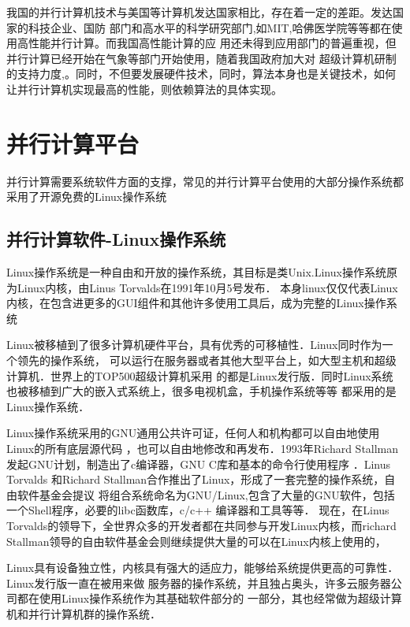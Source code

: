 我国的并行计算机技术与美国等计算机发达国家相比，存在着一定的差距。发达国家的科技企业、国防
部门和高水平的科学研究部门,如MIT,哈佛医学院等等都在使用高性能并行计算。而我国高性能计算的应
用还未得到应用部门的普遍重视，但并行计算已经开始在气象等部门开始使用，随着我国政府加大对
超级计算机研制的支持力度,。同时，不但要发展硬件技术，同时，算法本身也是关键技术，如何让并行计算机实现最高的性能，则依赖算法的具体实现。

    

\section{并行计算平台}
    并行计算需要系统软件方面的支撑，常见的并行计算平台使用的大部分操作系统都采用了开源免费的Linux操作系统

\subsection{并行计算软件-Linux操作系统}
    Linux操作系统是一种自由和开放的操作系统，其目标是类Unix.Linux操作系统原为Linux内核，由Linus Torvalds在1991年10月5号发布．
本身linux仅仅代表Linux内核，在包含进更多的GUI组件和其他许多使用工具后，成为完整的Linux操作系统

    Linux被移植到了很多计算机硬件平台，具有优秀的可移植性．Linux同时作为一个领先的操作系统，
可以运行在服务器或者其他大型平台上，如大型主机和超级计算机．世界上的TOP500超级计算机采用
的都是Linux发行版．同时Linux系统也被移植到广大的嵌入式系统上，很多电视机盒，手机操作系统等等
都采用的是Linux操作系统．

    Linux操作系统采用的GNU通用公共许可证，任何人和机构都可以自由地使用Linux的所有底层源代码
，也可以自由地修改和再发布．1993年Richard Stallman发起GNU计划，制造出了c编译器，GNU C库和基本的命令行使用程序
．Linus Torvalds 和Richard Stallman合作推出了Linux，形成了一套完整的操作系统，自由软件基金会提议
将组合系统命名为GNU/Linux,包含了大量的GNU软件，包括一个Shell程序，必要的libc函数库，c/c++
编译器和工具等等． 现在，在Linus Torvalds的领导下，全世界众多的开发者都在共同参与开发Linux内核，而richard 
Stallman领导的自由软件基金会则继续提供大量的可以在Linux内核上使用的，

    Linux具有设备独立性，内核具有强大的适应力，能够给系统提供更高的可靠性．Linux发行版一直在被用来做
服务器的操作系统，并且独占奥头，许多云服务器公司都在使用Linux操作系统作为其基础软件部分的
一部分，其也经常做为超级计算机和并行计算机群的操作系统．
    
